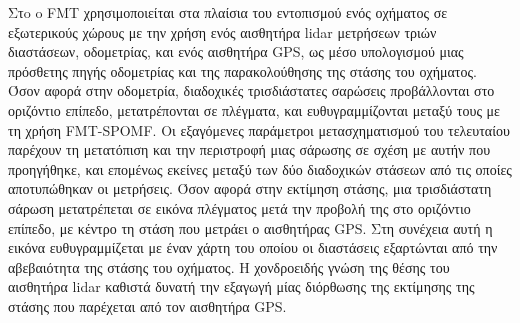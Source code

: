 Στo \cite{Rohde2016} o FMT χρησιμοποιείται στα πλαίσια του εντοπισμού ενός
οχήματος σε εξωτερικούς χώρους με την χρήση ενός αισθητήρα lidar μετρήσεων
τριών διαστάσεων, οδομετρίας, και ενός αισθητήρα GPS, ως μέσο υπολογισμού μιας
πρόσθετης πηγής οδομετρίας και της παρακολούθησης της στάσης του οχήματος. Όσον
αφορά στην οδομετρία, διαδοχικές τρισδιάστατες σαρώσεις προβάλλονται στο
οριζόντιο επίπεδο, μετατρέπονται σε πλέγματα, και ευθυγραμμίζονται μεταξύ τους
με τη χρήση FMT-SPOMF. Οι εξαγόμενες παράμετροι μετασχηματισμού του τελευταίου
παρέχουν τη μετατόπιση και την περιστροφή μιας σάρωσης σε σχέση με αυτήν που
προηγήθηκε, και επομένως εκείνες μεταξύ των δύο διαδοχικών στάσεων από τις
οποίες αποτυπώθηκαν οι μετρήσεις. Όσον αφορά στην εκτίμηση στάσης, μια
τρισδιάστατη σάρωση μετατρέπεται σε εικόνα πλέγματος μετά την προβολή της στο
οριζόντιο επίπεδο, με κέντρο τη στάση που μετράει ο αισθητήρας GPS. Στη
συνέχεια αυτή η εικόνα ευθυγραμμίζεται με έναν χάρτη του οποίου οι διαστάσεις
εξαρτώνται από την αβεβαιότητα της στάσης του οχήματος. Η χονδροειδής γνώση της
θέσης του αισθητήρα lidar καθιστά δυνατή την εξαγωγή μίας διόρθωσης της
εκτίμησης της στάσης που παρέχεται από τον αισθητήρα GPS.
